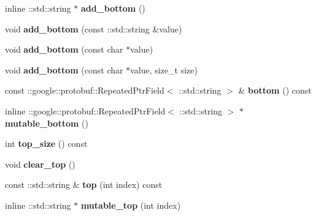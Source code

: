 \begin{DoxyCompactItemize}
inline \+::std\+::string $\ast$ {\bfseries add\+\_\+bottom} ()
\item 
\mbox{\label{classcaffe_1_1_v1_layer_parameter_a907ed0abc4549b811a01aba081eddb07}} 
void {\bfseries add\+\_\+bottom} (const \+::std\+::string \&value)
\item 
\mbox{\label{classcaffe_1_1_v1_layer_parameter_a84a5f7929f82e363bd18ad1f7e7a8f40}} 
void {\bfseries add\+\_\+bottom} (const char $\ast$value)
\item 
\mbox{\label{classcaffe_1_1_v1_layer_parameter_a96990fa0dbefa224b296da8c1aed74e3}} 
void {\bfseries add\+\_\+bottom} (const char $\ast$value, size\+\_\+t size)
\item 
\mbox{\label{classcaffe_1_1_v1_layer_parameter_a19add7cba3fab20009711f4cfd1f72ff}} 
const \+::google\+::protobuf\+::\+Repeated\+Ptr\+Field$<$ \+::std\+::string $>$ \& {\bfseries bottom} () const
\item 
\mbox{\label{classcaffe_1_1_v1_layer_parameter_a80f1b69065731e25b2f3f630345bd128}} 
inline \+::google\+::protobuf\+::\+Repeated\+Ptr\+Field$<$ \+::std\+::string $>$ $\ast$ {\bfseries mutable\+\_\+bottom} ()
\item 
\mbox{\label{classcaffe_1_1_v1_layer_parameter_a015c8e665535622de3a8f5d33c06b237}} 
int {\bfseries top\+\_\+size} () const
\item 
\mbox{\label{classcaffe_1_1_v1_layer_parameter_a5852dbfc38a6e686f708ebc482fafbfd}} 
void {\bfseries clear\+\_\+top} ()
\item 
\mbox{\label{classcaffe_1_1_v1_layer_parameter_ab9c7f56551025c4f003825a4c238c9a5}} 
const \+::std\+::string \& {\bfseries top} (int index) const
\item 
\mbox{\label{classcaffe_1_1_v1_layer_parameter_af73a215c962b79124d6cdb924b570170}} 
inline \+::std\+::string $\ast$ {\bfseries mutable\+\_\+top} (int index)

\end{DoxyCompactItemize}
